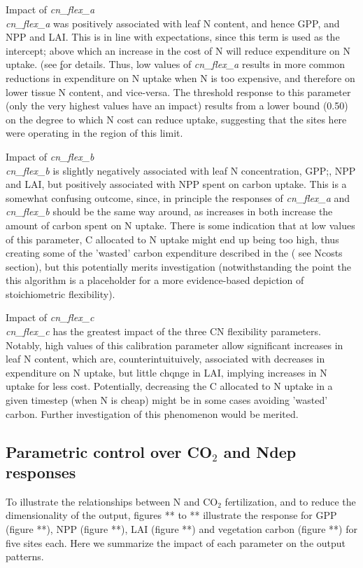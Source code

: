 \documentclass[draft,linenumbers]{agujournal}
\begin{document}
Impact of \emph{cn\_flex\_a}\\
\emph{cn\_flex\_a} was positively associated with leaf N content, and hence GPP, and NPP and LAI. This is in line with expectations, since this term is used as the intercept; above which an increase in the cost of N will reduce expenditure on N uptake.  (see \href{https://escomp.github.io/ctsm-docs/doc/build/html/tech_note/FUN/CLM50_Tech_Note_FUN.html#modifications-to-allow-variation-in-c-n-ratios} for details. Thus, low values of \emph{cn\_flex\_a}  results in more common reductions in expenditure on N uptake when N is too expensive, and therefore on lower tissue N content, and vice-versa.  The threshold response to this parameter (only the very highest values have an impact) results from a lower bound (0.50) on the degree to which N cost can reduce uptake, suggesting that the sites here were operating in the region of this limit. 

Impact of \emph{cn\_flex\_b}\\
\emph{cn\_flex\_b} is slightly negatively associated with leaf N concentration, GPP;, NPP and LAI, but positively associated with NPP spent on carbon uptake. This is a somewhat confusing outcome, since, in principle the responses of \emph{cn\_flex\_a} and \emph{cn\_flex\_b} should be the same way around, as increases in both increase the amount of carbon spent on N uptake. There is some indication that at low values of this parameter, C allocated to N uptake might end up being too high, thus creating some of the 'wasted' carbon expenditure described in the ( see Ncosts section), but this potentially merits investigation (notwithstanding the point the this algorithm is a placeholder for a more evidence-based depiction of stoichiometric flexibility). 

Impact of \emph{cn\_flex\_c}\\
\emph{cn\_flex\_c} has the greatest impact of the three CN flexibility parameters. Notably, high values of this calibration parameter allow significant increases in leaf N content, which are, counterintuituively, associated with decreases in expenditure on N uptake, but little chqnge in LAI, implying increases in N uptake for less cost. Potentially, decreasing the C allocated to N uptake in a given timestep (when N is cheap) might be in some cases avoiding 'wasted' carbon. Further investigation of this phenomenon would be merited.


\subsection{Parametric control over CO$_{2}$ and Ndep responses}
To illustrate the relationships between N and CO$_{2}$ fertilization, and to reduce the dimensionality of the output, figures ** to ** illustrate the response for GPP (figure **), NPP (figure **), LAI (figure **) and vegetation carbon (figure **) for five sites each. Here we summarize the impact of each parameter on the output patterns. 
\end{document}
